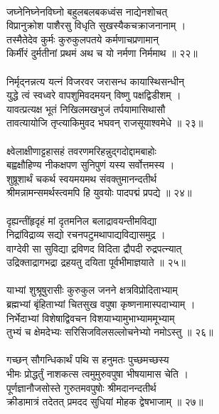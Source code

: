 \\
जघ्नेनिघ्नेनविघ्नो  बहुलबलबकध्वंस नाद्येनशोचत्\\
     विप्रानुक्रोश पाशैरसु विधृति सुखस्यैकचक्राजनानाम् ।\\
तस्मैतेदेव कुर्मः कुरुकुलपतये कर्मणाचप्रणामान्\\
     किर्मीरं दुर्मतीनां प्रथमं अथ च यो नर्मणा निर्ममाथ ॥ २२॥\\
\\
निर्मृद्नन्नत्य यत्नं विजरवर जरासन्ध कायास्थिसन्धीन्\\
     युद्धे त्वं स्वध्वरे वापशुमिवदमयन् विष्णु पक्षद्विडीशम् ।\\
यावत्प्रत्यक्ष भूतं निखिलमखभुजं तर्पयामासिथासौ\\
     तावत्यायोजि तृप्त्याकिमुवद भघवन् राजसूयाश्वमेधे ॥ २३॥\\
\\
क्ष्वेलाक्षीणाट्टहासहं तवरणमरिहन्नुद्गदोद्दामबाहोः\\
     बह्वक्षौहिण्य नीकक्षपण सुनिपुणं यस्य सर्वोत्तमस्य ।\\
शुष्रूशार्थं चकर्थ स्वयमयमथ संवक्तुमानन्दतीर्थ\\
     श्रीमन्नामन्समर्थस्त्वमपि हि युवयोः पादपद्मं प्रपद्ये ॥ २४॥\\
\\
दृह्यन्तींहृदृहं मां दृतमनिल बलाद्रावयन्तीमविद्या\\
     निद्रांविद्राव्य सद्यो रचनपटुमथापाद्यविद्यासमुद्र ।\\
वाग्देवी सा सुविद्या द्रविणद विदिता द्रौपदी रुद्रपत्न्यात्\\
     उद्रिक्ताद्रागभद्रा द्रहयतु दयिता पूर्वभीमाज्ञयाते ॥ २५॥\\
\\
याभ्यां शुश्रूषुरासीः  कुरुकुल जनने क्षत्रविप्रोदिताभ्याम्\\
     ब्रह्मभ्यां बृंहिताभ्यां चितसुख वपुषा कृष्णनामास्पदाभ्याम् ।\\
निर्भेदाभ्यां विशेषाद्विवचन विशयाभ्यामुभाभ्याममूभ्याम्\\
     तुभ्यं च क्षेमदेभ्यः सरिसिजविलसल्लोचनेभ्यो नमोऽस्तु ॥ २६॥\\
\\
गच्छन् सौगन्धिकार्थं पथि स हनुमतः पुच्छमच्छस्य\\
     भीमः प्रोद्धर्तुं नाशकत्स त्वमुमुरुवपुषा भीषयामास चेति ।\\
पूर्णज्ञानौजसोस्ते गुरुतमवपुषोः श्रीमदानन्दतीर्थ\\
     क्रीडामात्रं तदेतत् प्रमदद सुधियां मोहक द्वेषभाजाम् ॥ २७॥\\

